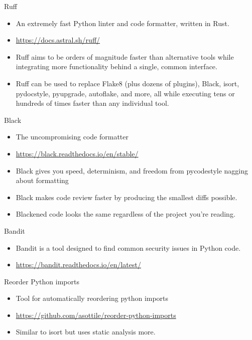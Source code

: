 \begin{frame}[c]{Ruff}
  \begin{itemize}
    \item An extremely fast Python linter and code formatter,
      written in Rust.
    \item \href{https://docs.astral.sh/ruff/}{https://docs.astral.sh/ruff/}
    \pausa
    \item Ruff aims to be orders of magnitude faster than alternative tools
      while integrating more functionality behind a single, common interface.
    \pausa
    \item Ruff can be used to replace Flake8 (plus dozens of plugins), Black,
      isort, pydocstyle, pyupgrade, autoflake, and more, all while executing
      tens or hundreds of times faster than any individual tool.
  \end{itemize}
\end{frame}

\begin{frame}[c]{Black}
  \begin{itemize}
    \item The uncompromising code formatter
    \item \href{https://black.readthedocs.io/en/stable/}{https://black.readthedocs.io/en/stable/}
    \pausa
    \item Black gives you speed, determinism, and freedom from pycodestyle
      nagging about formatting
    \pausa
    \item Black makes code review faster by producing the smallest diffs
      possible. 
    \pausa
    \item Blackened code looks the same regardless of the project you’re
      reading.
  \end{itemize}
\end{frame}

\begin{frame}[c]{Bandit}
  \begin{itemize}
    \item Bandit is a tool designed to find common security issues in
      Python code. 
    \item \href{https://bandit.readthedocs.io/en/latest/}{https://bandit.readthedocs.io/en/latest/}
  \end{itemize}
\end{frame}

\begin{frame}[c]{Reorder Python imports}
  \begin{itemize}
    \item Tool for automatically reordering python imports
    \item \href{https://github.com/asottile/reorder-python-imports}{https://github.com/asottile/reorder-python-imports}
    \pausa
    \item Similar to isort but uses static analysis more.
  \end{itemize}
\end{frame}

